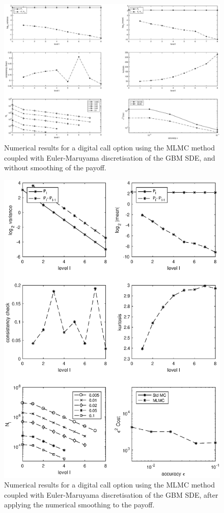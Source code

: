 \FloatBarrier
	\begin{figure}[h!]
\centering
\includegraphics[width=1\linewidth]{./figures/MLMC_binary_opt/euler_digital_without_smoothing}

\caption{Numerical results for a digital call option using the MLMC method coupled with Euler-Maruyama discretisation of the GBM SDE, and without smoothing of the payoff.}
\label{fig:euler_digital_without_smoothing}
\end{figure}

\FloatBarrier

\FloatBarrier
	\begin{figure}[h!]
\centering
\includegraphics[width=0.7\linewidth]{./figures/MLMC_binary_opt/digital_option_with_smoothing_L_0_2_steps}

\caption{Numerical results for a digital call option using the MLMC method coupled with Euler-Maruyama discretisation of the GBM SDE, after applying  the numerical smoothing to the payoff.}
\label{fig:euler_digital_with_smoothing}
\end{figure}

